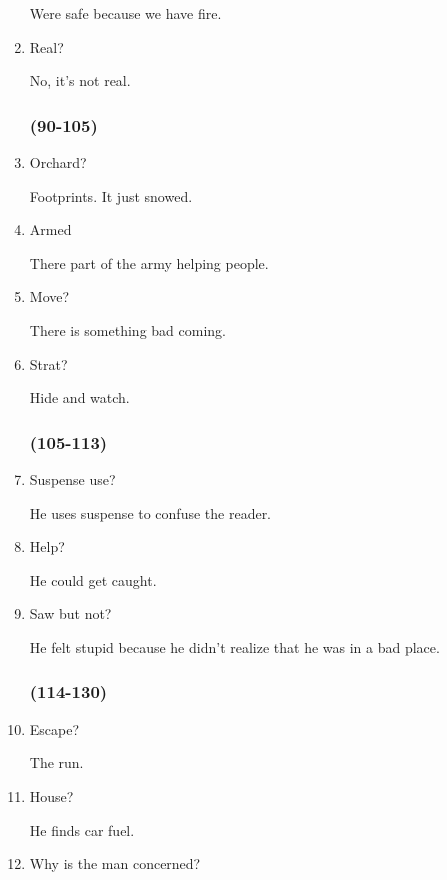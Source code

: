 \begin{multicols}{3}
\begin{enumerate}
    Were safe because we have fire.

    \item Real?

    No, it’s not real.

    \subsubsection{(90-105)}

    \item Orchard?

    Footprints. It just snowed.

    \item Armed

    There part of the army helping people.

    \item Move?

    There is something bad coming.

    \item Strat?

    Hide and watch.

    \subsubsection{(105-113)}

    \item Suspense use?

    He uses suspense to confuse the reader.

    \item Help?

    He could get caught.

    \item Saw but not?

    He felt stupid because he didn’t realize that he was in a bad place.

    \subsubsection{(114-130)}

    \item Escape?

    The run.

    \item House?

    He finds car fuel.

    \item Why is the man concerned?


\end{enumerate}
\end{multicols}
